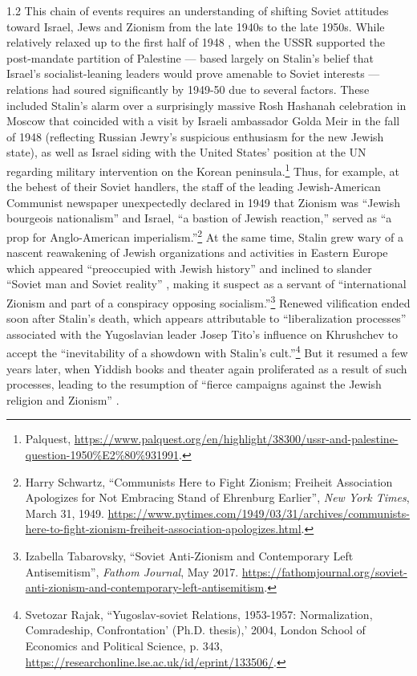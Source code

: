 \documentclass[../unravbook.tex]{subfiles}
\begin{document}
\begin{spacing}{1.2}
This chain of events requires an understanding of shifting Soviet attitudes toward Israel, Jews and Zionism from the late 1940s to the late 1950s. While relatively relaxed up to the first half of 1948 \parencite[234]{Pinkus-1984}, when the USSR supported the post-mandate partition of Palestine --- based largely on Stalin's belief that Israel's socialist-leaning leaders would prove amenable to Soviet interests --- relations had soured significantly by 1949-50 due to several factors. These included Stalin's alarm over a surprisingly massive Rosh Hashanah celebration in Moscow that coincided with a visit by Israeli ambassador Golda Meir in the fall of 1948 (reflecting Russian Jewry's suspicious enthusiasm for the new Jewish state), as well as Israel siding with the United States' position at the UN regarding military intervention on the Korean peninsula.\footnote{Palquest, \url{https://www.palquest.org/en/highlight/38300/ussr-and-palestine-question-1950\%E2\%80\%931991}.} Thus, for example, at the behest of their Soviet handlers, the staff of the leading Jewish-American Communist newspaper unexpectedly declared in 1949 that Zionism was ``Jewish bourgeois nationalism'' and Israel, ``a bastion of Jewish reaction,'' served as ``a prop for Anglo-American imperialism.''\footnote{Harry Schwartz, \enquote{Communists Here to Fight Zionism; Freiheit Association Apologizes for Not Embracing Stand of Ehrenburg Earlier}, \textit{New York Times}, March 31, 1949. \url{https://www.nytimes.com/1949/03/31/archives/communists-here-to-fight-zionism-freiheit-association-apologizes.html}.} At the same time, Stalin grew wary of a nascent reawakening of Jewish organizations and activities in Eastern Europe which appeared \enquote{preoccupied with Jewish history} and inclined to slander \enquote{Soviet man and Soviet reality} \parencite[148--149]{Pinkus-1984}, making it suspect as a servant of \enquote{international Zionism and part of a conspiracy opposing socialism.}\footnote{Izabella Tabarovsky, ``Soviet Anti-Zionism and Contemporary Left Antisemitism'', \textit{Fathom Journal}, May 2017. \url{https://fathomjournal.org/soviet-anti-zionism-and-contemporary-left-antisemitism}.} Renewed vilification ended soon after Stalin's death, which appears attributable to ``liberalization processes'' associated with the Yugoslavian leader Josep Tito's influence on Khrushchev to accept the ``inevitability of a showdown with Stalin's cult.''\footnote{Svetozar Rajak, ``Yugoslav-soviet Relations, 1953-1957: Normalization, Comradeship, Confrontation' (Ph.D. thesis),' 2004, London School of Economics and Political Science, p. 343, \url{https://researchonline.lse.ac.uk/id/eprint/133506/}.} But it resumed a few years later, when Yiddish books and theater again proliferated as a result of such processes, leading to the resumption of \enquote{fierce campaigns against the Jewish religion and Zionism} \parencite[151]{Pinkus-1984}.


\end{spacing}
\end{document}

